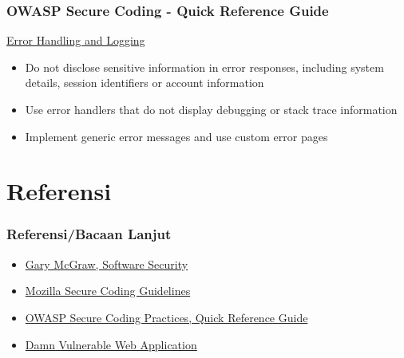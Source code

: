 \documentclass[xcolor=pdftex,table,handouts]{beamer}
\begin{document}
\begin{frame}
	\frametitle{OWASP Secure Coding - Quick Reference Guide}
	\underline{Error Handling and Logging} \\
	\begin{itemize}
	\item Do not disclose sensitive information in error responses, including system details, session identifiers or account information
	\item Use error handlers that do not display debugging or stack trace information
	\item Implement generic error messages and use custom error pages
	\end{itemize}
\end{frame}

\section{Referensi}
\begin{frame}
	\frametitle{Referensi/Bacaan Lanjut}
	\begin{itemize}
		\item {\href{http://www.amazon.com/Software-Security-Building-In/dp/0321356705}{Gary McGraw, Software Security}}						
		\item {\href{https://wiki.mozilla.org/WebAppSec/Secure_Coding_Guidelines}{Mozilla Secure Coding Guidelines}}
		\item {\href{https://www.owasp.org/index.php/OWASP_Secure_Coding_Practices_-_Quick_Reference_Guide}{OWASP Secure Coding Practices, Quick Reference Guide}}		
		\item {\href{http://www.dvwa.co.uk}{Damn Vulnerable Web Application}}
	\end{itemize}
\end{frame}


\end{document}
